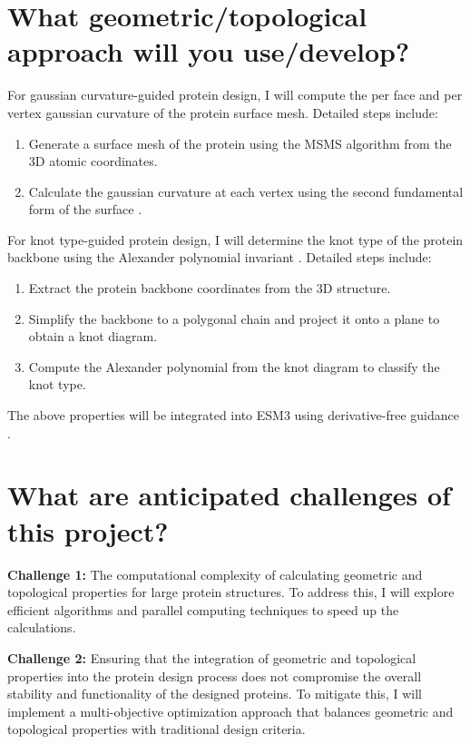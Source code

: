 \documentclass{article}
\begin{document}
\section{What geometric/topological approach will you
use/develop?}
For gaussian curvature-guided protein design, I will compute the per face and per vertex gaussian curvature of the protein surface mesh. Detailed steps include:
\begin{enumerate}
    \item Generate a surface mesh of the protein using the MSMS algorithm \cite{Sanner1996} from the 3D atomic coordinates.
    \item Calculate the gaussian curvature at each vertex using the second fundamental form of the surface \cite{Hege2003}.
\end{enumerate}

For knot type-guided protein design, I will determine the knot type of the protein backbone using the Alexander polynomial invariant \cite{Alexander1928,Dabrowski-Tumanski2021}. Detailed steps include:
\begin{enumerate}
    \item Extract the protein backbone coordinates from the 3D structure.
    \item Simplify the backbone to a polygonal chain and project it onto a plane to obtain a knot diagram.
    \item Compute the Alexander polynomial from the knot diagram to classify the knot type.
\end{enumerate}

The above properties will be integrated into ESM3 using derivative-free guidance \cite{Li2024}.

\section{What are anticipated challenges of this project?}

\textbf{Challenge 1:} The computational complexity of calculating geometric and topological properties for large protein structures.
To address this, I will explore efficient algorithms and parallel computing techniques to speed up the calculations.

\textbf{Challenge 2:} Ensuring that the integration of geometric and topological properties into the protein design process does not compromise the overall stability and functionality of the designed proteins.
To mitigate this, I will implement a multi-objective optimization approach that balances geometric and topological properties with traditional design criteria.
\end{document}
